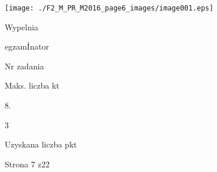 \documentclass[a4paper,12pt]{article}
\begin{document}
\begin{center}
\texttt{[image: ./F2\_M\_PR\_M2016\_page6\_images/image001.eps]}
\end{center}
Wypelnia

egzamÍnator

Nr zadania

Maks. liczba kt

8.

3

Uzyskana liczba pkt

Strona 7 z22
\end{document}
